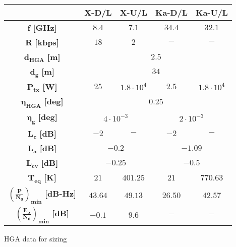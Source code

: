\vspace{3mm}
\begin{minipage}{0.5\linewidth}
    \centering
    \captionsetup{type=table}
    \renewcommand{\arraystretch}{2}
    \setlength\extrarowheight{-1pt}
    \begin{tabular}{|c|c|c|c|c|}
        \hline
        & \textbf{X-D/L} & \textbf{X-U/L} & \textbf{Ka-D/L}& \textbf{Ka-U/L} \\
        \hline
        $\boldsymbol{f}$ \textbf{[GHz]} & $8.4$ & $7.1$ & $34.4$ & $32.1$ \\
        \hline
        $\boldsymbol{R}$ \textbf{[kbps]} & $18$ & $2$ & $-$ & $-$ \\
        \hline
        $\boldsymbol{d_{HGA}}$ \textbf{[m]} &\multicolumn{4}{c|}{$2.5$} \\
        \hline
        $\boldsymbol{d_{g}}$ \textbf{[m]} &\multicolumn{4}{c|}{$34$} \\
        \hline
        $\boldsymbol{P_{tx}}$ \textbf{[W]} & $25$ & $1.8 \cdot 10^{4}$ & $2.5$ & $1.8 \cdot 10^{4}$ \\
        \hline
        $\boldsymbol{\eta_{HGA}}$ \textbf{[deg]} &\multicolumn{4}{c|}{$0.25$} \\
        \hline
        $\boldsymbol{\eta_{g}}$ \textbf{[deg]} &\multicolumn{2}{c|}{$4 \cdot 10^{-3}$} & \multicolumn{2}{c|}{$2 \cdot 10^{-3}$}\\
        \hline
        $\boldsymbol{L_c}$ \textbf{[dB]} & $-2$ & $-$ & $-2$ & $-$ \\
        \hline
        $\boldsymbol{L_{a}}$ \textbf{[dB]} &\multicolumn{2}{c|}{$-0.2$} & \multicolumn{2}{c|}{$-1.09$}\\
        \hline
        $\boldsymbol{L_{cv}}$ \textbf{[dB]} &\multicolumn{2}{c|}{$-0.25$} & \multicolumn{2}{c|}{$-0.5$}\\
        \hline
        $\boldsymbol{T_{eq}}$ \textbf{[K]} & $21$ & $401.25$ & $21$ & $770.63$ \\
        \hline
        $\boldsymbol{\left(\frac{P}{N_0}\right)_{min}}$ \textbf{[dB-Hz]} & $43.64$ & $49.13$ & $26.50$ & $42.57$ \\
        \hline
        $\boldsymbol{\left(\frac{E_b}{N_0}\right)_{min}}$ \textbf{[dB]} & $-0.1$ & $9.6$ & $-$ & $-$ \\
        \hline
    \end{tabular}
    \caption{HGA data for sizing \cite{juno_telecommunication}}
    \label{table:dati_HGA}
\end{minipage}\hfill

